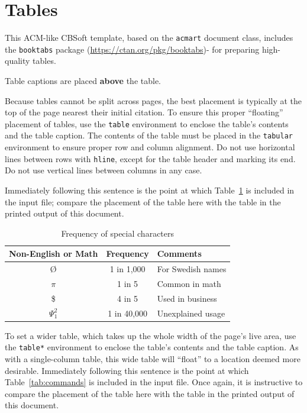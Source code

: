 \documentclass[sigconf]{acmart}
\begin{document}
\section{Tables}

This ACM-like CBSoft template, based on the \verb|acmart| document class, includes the \verb|booktabs| package (\url{https://ctan.org/pkg/booktabs})- for preparing high-quality tables.

Table captions are placed \textbf{above} the table.

Because tables cannot be split across pages, the best placement is typically at the top of the page nearest their initial citation. To ensure this proper ``floating'' placement of tables, use the \texttt{table} environment to enclose the table's contents and the table caption. The contents of the table must be placed in the \texttt{tabular} environment to ensure proper row and column alignment. Do not use horizontal lines between rows with \texttt{hline}, except for the table header and marking its end. Do not use vertical lines between columns in any case.

Immediately following this sentence is the point at which Table~\ref{tab:freq} is included in the input file; compare the placement of the table here with the table in the printed output of this document.

\begin{table}
  \caption{Frequency of special characters}
  \label{tab:freq}
  \begin{tabular}{ccl}
    \toprule
    Non-English or Math & Frequency   & Comments\\
    \midrule
    \O                  & 1 in 1,000  & For Swedish names\\
    $\pi$               & 1 in 5      & Common in math\\
    \$                  & 4 in 5      & Used in business\\
    $\Psi^2_1$          & 1 in 40,000 & Unexplained usage\\
  \bottomrule
\end{tabular}
\end{table}

To set a wider table, which takes up the whole width of the page's live area, use the \texttt{table*} environment to enclose the table's contents and the table caption. As with a single-column table, this wide table will ``float'' to a location deemed more desirable. Immediately following this sentence is the point at which Table~\ref{tab:commands} is included in the input file. Once again, it is instructive to compare the placement of the table here with the table in the printed output of this document.
\end{document}
